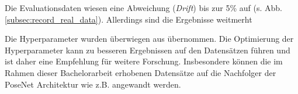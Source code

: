 Die Evaluationsdaten wiesen eine Abweichung (\textit{Drift}) bis zur 5\% auf (s. Abb. \ref{subsec:record_real_data}). Allerdings sind die Ergebnisse weitmerht
%






Die Hyperparameter wurden überwiegen aus \citet{acharyaBIMPoseNetIndoorCamera2019} übernommen. Die Optimierung der Hyperparameter kann zu besseren Ergebnissen auf den Datensätzen führen und ist daher eine Empfehlung für weitere Forschung. Insbesondere können die im Rahmen dieser Bachelorarbeit erhobenen Datensätze auf die Nachfolger der PoseNet Architektur wie z.B. \cite{kendallModellingUncertaintyDeep2016, walchImageBasedLocalizationUsing2017, kendallGeometricLossFunctions2017, clarkVidLocDeepSpatioTemporal2017} angewandt werden.


% 

